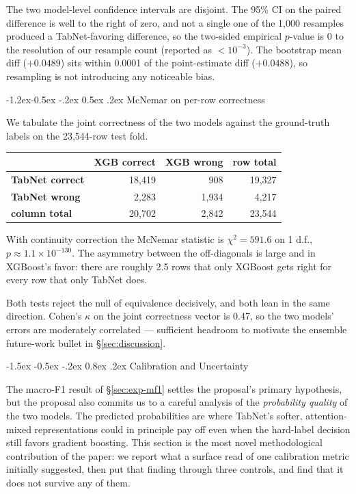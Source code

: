 \documentclass[11pt]{article}
\makeatletter
\renewcommand\section{\@startsection{section}{1}{\z@}%
  {-1.5ex \@plus -0.5ex \@minus -.2ex}%
  {0.8ex \@plus.2ex}%
  {\normalfont\large\bfseries}}
\renewcommand\subsection{\@startsection{subsection}{2}{\z@}%
  {-1.2ex\@plus -0.5ex \@minus -.2ex}%
  {0.5ex \@plus .2ex}%
  {\normalfont\normalsize\bfseries}}
\newcommand{\mF}{macro-F1}
\makeatother
\begin{document}
The two model-level confidence intervals are disjoint. The 95\% CI
on the paired difference is well to the right of zero, and not a
single one of the 1{,}000 resamples produced a TabNet-favoring
difference, so the two-sided empirical $p$-value is 0 to the
resolution of our resample count (reported as $< 10^{-3}$). The
bootstrap mean diff ($+0.0489$) sits within 0.0001 of the
point-estimate diff ($+0.0488$), so resampling is not introducing
any noticeable bias.

\subsection{McNemar on per-row correctness}

We tabulate the joint correctness of the two models against the
ground-truth labels on the 23{,}544-row test fold.

\begin{center}
\small
\begin{tabular}{lrrr}
\toprule
                       & XGB correct & XGB wrong & row total \\
\midrule
\textbf{TabNet correct} & 18{,}419 &    908 & 19{,}327 \\
\textbf{TabNet wrong}   &  2{,}283 &  1{,}934 &  4{,}217 \\
\textbf{column total}   & 20{,}702 &  2{,}842 & 23{,}544 \\
\bottomrule
\end{tabular}
\end{center}

With continuity correction the McNemar statistic is $\chi^2 = 591.6$
on 1 d.f., $p \approx 1.1 \times 10^{-130}$. The asymmetry between
the off-diagonals is large and in XGBoost's favor: there are roughly
2.5 rows that only XGBoost gets right for every row that only
TabNet does.

Both tests reject the null of equivalence decisively, and both lean
in the same direction. Cohen's $\kappa$ on the joint correctness
vector is 0.47, so the two models' errors are moderately correlated
--- sufficient headroom to motivate the ensemble future-work bullet
in \S\ref{sec:discussion}.

\section{Calibration and Uncertainty}\label{sec:audit}

The \mF{} result of \S\ref{sec:exp-mf1} settles the proposal's
primary hypothesis, but the proposal also commits us to a careful
analysis of the \emph{probability quality} of the two models. The
predicted probabilities are where TabNet's softer, attention-mixed
representations could in principle pay off even when the hard-label
decision still favors gradient boosting. This section is the most
novel methodological contribution of the paper: we report what a
surface read of one calibration metric initially suggested, then put
that finding through three controls, and find that it does not
survive any of them.
\end{document}
